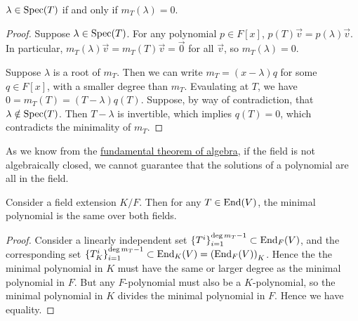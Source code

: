 \begin{lemma}\label{lem:eigenvalue-min-poly}
    \(\lambda \in \operatorname{Spec}(T)\) if and only if \(m_T(\lambda) = 0\).
\end{lemma}
\begin{proof}
    Suppose \(\lambda \in \operatorname{Spec}(T)\).
    For any polynomial \(p \in F[x]\),
    \(p(T)\vec{v} = p(\lambda)\vec{v}\).
    In particular, \(m_T(\lambda)\vec{v} = m_T(T)\vec{v} = \vec{0}\) for all \(\vec{v}\),
    so \(m_T(\lambda) = 0\).

    Suppose \(\lambda\) is a root of \(m_T\).
    Then we can write \(m_T = (x-\lambda)q\) for some \(q \in F[x]\),
    with a smaller degree than \(m_T\).
    Evaulating at \(T\), we have \(0 = m_T(T) = (T-\lambda)q(T)\).
    Suppose, by way of contradiction, that \(\lambda \notin \operatorname{Spec}(T)\).
    Then \(T-\lambda\) is invertible, which implies \(q(T) = 0\),
    which contradicts the minimality of \(m_T\).
\end{proof}
\begin{remark}
    As we know from the \hyperref[thm:fta]{fundamental theorem of algebra},
    if the field is not algebraically closed,
    we cannot guarantee that the solutions of a polynomial are all in the field.
\end{remark}
\begin{corollary}\label{cor:min-poly-field-ext}
    Consider a field extension \(K/F\).
    Then for any \(T \in \operatorname{End}(V)\),
    the minimal polynomial is the same over both fields.
\end{corollary}
\begin{proof}
    Consider a linearly independent set \({\{T^i\}}_{i=1}^{\deg m_T - 1} \subset \operatorname{End}_F(V)\),
    and the corresponding set \({\{T_K^i\}}_{i=1}^{\deg m_T - 1} \subset \End_K(V) = \pqty{\End_F(V)}_K\).
    Hence the the minimal polynomial in \(K\) must have the same or larger degree
    as the minimal polynomial in \(F\).
    But any \(F\)-polynomial must also be a \(K\)-polynomial,
    so the minimal polynomial in \(K\) divides the minimal polynomial in \(F\).
    Hence we have equality.
\end{proof}

